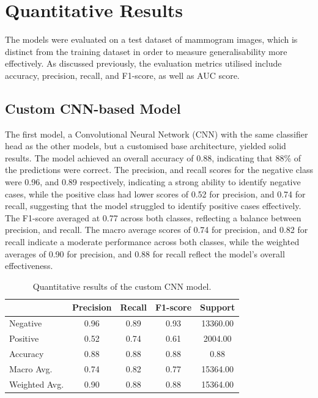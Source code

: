 \documentclass[../main]{subfiles}
\begin{document}
\section{Quantitative Results}
\label{sec:quantitative-results}
The models were evaluated on a test dataset of mammogram images, which is distinct from the training dataset in order to measure generalisability more effectively. As discussed previously, the evaluation metrics utilised include accuracy, precision, recall, and F1-score, as well as AUC score.

\subsection{Custom CNN-based Model}
The first model, a Convolutional Neural Network (CNN) with the same classifier head as the other models, but a customised base architecture, yielded solid results. The model achieved an overall accuracy of 0.88, indicating that 88\% of the predictions were correct. The precision, and recall scores for the negative class were 0.96, and 0.89 respectively, indicating a strong ability to identify negative cases, while the positive class had lower scores of 0.52 for precision, and 0.74 for recall, suggesting that the model struggled to identify positive cases effectively. The F1-score averaged at 0.77 across both classes, reflecting a balance between precision, and recall. The macro average scores of 0.74 for precision, and 0.82 for recall indicate a moderate performance across both classes, while the weighted averages of 0.90 for precision, and 0.88 for recall reflect the model's overall effectiveness.

\begin{table}[h]
    \centering
    \begin{tabular}{|l|c|c|c|c|}
        \hline
         & Precision & Recall & F1-score & Support \\ \hline
        Negative & 0.96 & 0.89 & 0.93 & 13360.00 \\ \hline
        Positive & 0.52 & 0.74 & 0.61 & 2004.00 \\ \hline
        Accuracy & 0.88 & 0.88 & 0.88 & 0.88 \\ \hline
        Macro Avg. & 0.74 & 0.82 & 0.77 & 15364.00 \\ \hline
        Weighted Avg. & 0.90 & 0.88 & 0.88 & 15364.00 \\ \hline
    \end{tabular}
    \caption{Quantitative results of the custom CNN model.}
    \label{tab:quantitative-results-custom-cnn}
\end{table}
\end{document}
